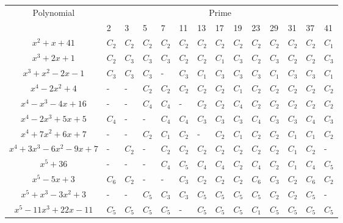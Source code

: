\documentclass{article}
\begin{document}
\begin{table}[hp]
\begin{center}
\begin{tabular}{|c|lllllllllllll|}
\hline
\multirow{2}{*}{Polynomial}        & \multicolumn{13}{c|}{Prime}                                                 \\ \cline{2-14} 
                                   & 2   & 3   & 5   & 7   & 11  & 13  & 17  & 19  & 23  & 29  & 31  & 37  & 41  \\ \hline
$x^2+x+41$                         & $C_2$ & $C_2$ & $C_2$ & $C_2$ & $C_2$ & $C_2$ & $C_2$ & $C_2$ & $C_2$ & $C_2$ & $C_2$ & $C_2$ & $C_1$ \\
$x^3+2x+1$                         & $C_2$ & $C_3$ & $C_3$ & $C_3$ & $C_2$ & $C_2$ & $C_1$ & $C_3$ & $C_2$ & $C_3$ & $C_2$ & $C_2$ & $C_3$ \\
$x^3+x^2-2x-1$                     & $C_3$ & $C_3$ & $C_3$ & -   & $C_3$ & $C_1$ & $C_3$ & $C_3$ & $C_3$ & $C_1$ & $C_3$ & $C_3$ & $C_1$ \\
$x^4-2x^2+4$                       & -   & -   & $C_2$ & $C_2$ & $C_2$ & $C_2$ & $C_2$ & $C_1$ & $C_2$ & $C_2$ & $C_2$ & $C_2$ & $C_2$ \\
$x^4-x^3-4x+16$                    & -   & -   & $C_4$ & $C_4$ & -   & $C_2$ & $C_2$ & $C_4$ & $C_2$ & $C_2$ & $C_2$ & $C_2$ & $C_2$ \\
$ x^4 - 2x^3 + 5x + 5$             & $C_4$ & -   & -   & $C_4$ & $C_4$ & $C_3$ & $C_3$ & $C_3$ & $C_4$ & $C_3$ & $C_3$ & $C_4$ & $C_3$ \\
$x^4 + 7x^2 + 6x + 7$              & -   & -   & $C_2$ & $C_1$ & $C_2$ & -   & $C_2$ & $C_1$ & $C_2$ & $C_2$ & $C_1$ & $C_1$ & $C_2$ \\
$ x^4 + 3x^3 - 6x^2 - 9x + 7$      & -   & $C_2$ & -   & $C_2$ & $C_2$ & $C_2$ & $C_2$ & $C_2$ & $C_2$ & $C_2$ & $C_1$ & $C_2$ & -   \\
$ x^5 + 36$                        & -   & -   & -   & $C_4$ & $C_5$ & $C_4$ & $C_4$ & $C_2$ & $C_4$ & $C_2$ & $C_1$ & $C_4$ & $C_5$ \\
$ x^5 - 5x + 3$                    & $ C_6$ 	& $C_2$ &	- &  -	& $C_3$	& $C_2$	&$ C_2$	&$ C_2$	&$ C_6$	& $C_3$	&$ C_2$	& $C_6$	&$ C_2$ \\
$ x^5 + x^3 - 3x^2 + 3$            & -   & -   & $C_5$ & $C_3$ & $C_3$ & $C_5$ & $C_5$ & $C_5$ & $C_5$ & $C_2$ & $C_2$ & $C_5$ & -   \\
$ x^5 - 11x^3 + 22x - 11 $         & $C_5$ & $C_5$ & $C_5$ & $C_5$ & -   & $C_5$ & $C_5$ & $C_5$ & $C_1$ & $C_5$ & $C_5$ & $C_5$ & $C_5$ \\

\end{tabular}
\end{center}
\end{table}
\end{document}

